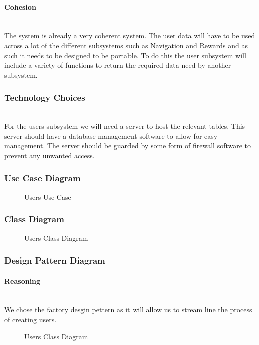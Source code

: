 \paragraph{Cohesion}
\mbox{}\\
The system is already a very coherent system. The user data will have to be used across a lot of the different subsystems such as Navigation and Rewards and as such it needs to be designed to be portable. To do this the user subsystem will include a variety of functions to return the required data need by another subsystem. 

\subsubsection{Technology Choices}
\mbox{}\\
For the users subsystem we will need a server to host the relevant tables. This server should have a database management software to allow for easy management. The server should be 
guarded by some form of firewall software to prevent any unwanted access. 

\subsubsection{Use Case Diagram}
	\begin{figure}[h!]
	\caption{Users Use Case}
	\end{figure}
	
\subsubsection{Class Diagram}
	\begin{figure}[h!]
	\caption{Users Class Diagram}
	\end{figure}

\subsubsection{Design Pattern Diagram}
	\paragraph{Reasoning}
	\mbox{}\\
	We chose the factory desgin pettern as it will allow us to stream line the process of creating users. 
	\begin{figure}[h!]
	\caption{Users Class Diagram}
	\end{figure}
